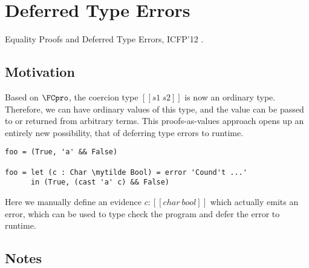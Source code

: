 \section{Deferred Type Errors}

Equality Proofs and Deferred Type Errors, ICFP'12 \citep{vytiniotis2012equality}.

\subsection{Motivation}

Based on $\FCpro$, the coercion type $[[ s1 ~ s2 ]]$ is now an ordinary type.
Therefore, we can have ordinary values of this type, and the value can be passed
to or returned from arbitrary terms. This proofs-as-values approach opens up an
entirely new possibility, that of deferring type errors to runtime.

\begin{Verbatim}[commandchars=\\\{\}]
foo = (True, 'a' && False)

foo = let (c : Char \mytilde Bool) = error 'Cound't ...'
      in (True, (cast 'a' c) && False)
\end{Verbatim}

Here we manually define an evidence $ c : [[ char ~ bool]]$ which actually emits
an error, which can be used to type check the program and defer the error to
runtime.

\subsection{Notes}

